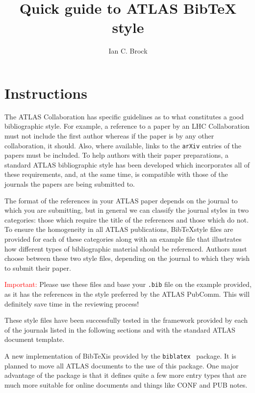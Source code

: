 \documentclass{../../style/atlasdoc}
\title{Quick guide to ATLAS BibTeX style}
\author{Ian C. Brock}
\newcommand*{\BibTeX}{Bib\TeX}
\begin{document}
 

\maketitle

\section{Instructions}

The ATLAS Collaboration has specific guidelines as to what constitutes a good bibliographic style. 
For example, a reference to a paper by an LHC Collaboration must not include the first author whereas if the paper is by any other collaboration, it should. 
Also, where available, links to the \texttt{arXiv} entries of the papers must be included. 
To help authors with their paper preparations, a standard ATLAS bibliographic style has been developed which incorporates all of these requirements, 
and, at the same time, is compatible with those of the journals the papers are being submitted to. 

The format of the references in your ATLAS paper depends on the journal to which you are submitting,
but in general we can classify the journal styles in two categories: those which require the title of the references and those which do not. 
To ensure the homogeneity in all ATLAS publications, 
\BibTeX style files are provided for each of these categories along with an example file that illustrates how different types of bibliographic material should be referenced.
Authors must choose between these two style files, depending on the journal to which they wish to submit their paper.

\textcolor{red}{Important:} Please use these files and base your \texttt{.bib} file on the example provided,
as it has the references in the style preferred by the ATLAS PubComm.
This will definitely save time in the reviewing process!

These style files have been successfully tested in the framework provided by each of the journals listed in the following sections and with the standard ATLAS document template.

A new implementation of \BibTeX is provided by the \texttt{biblatex}~\cite{biblatex} package.
It is planned to move all ATLAS documents to the use of this package.
One major advantage of the package is that it defines quite a few more entry types
that are much more suitable for online documents and things like CONF and PUB notes.
\end{document}
